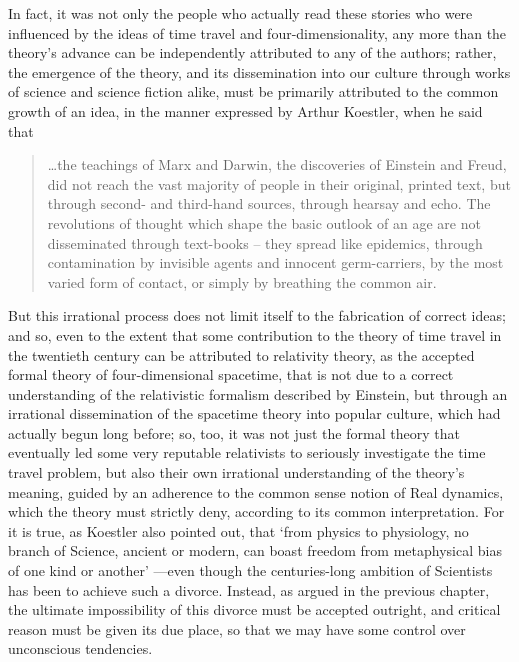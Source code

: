 In fact, it was not only the people who actually read these stories who were influenced by the ideas of time travel and four-dimensionality, any more than the theory's advance can be independently attributed to any of the authors; rather, the emergence of the theory, and its dissemination into our culture through works of science and science fiction alike, must be primarily attributed to the common growth of an idea, in the manner expressed by Arthur Koestler, when he said that \cite{Koestler1959}
\begin{quote}
\ldots the teachings of Marx and Darwin, the discoveries of Einstein and Freud, did not reach the vast majority of people in their original, printed text, but through second- and third-hand sources, through hearsay and echo. The revolutions of thought which shape the basic outlook of an age are not disseminated through text-books -- they spread like epidemics, through contamination by invisible agents and innocent germ-carriers, by the most varied form of contact, or simply by breathing the common air.
\end{quote}

But this irrational process does not limit itself to the fabrication of correct ideas; and so, even to the extent that some contribution to the theory of time travel in the twentieth century can be attributed to relativity theory, as the accepted formal theory of four-dimensional spacetime, that is not due to a correct understanding of the relativistic formalism described by Einstein, but through an irrational dissemination of the spacetime theory into popular culture, which had actually begun long before; so, too, it was not just the formal theory that eventually led some very reputable relativists to seriously investigate the time travel problem, but also their own irrational understanding of the theory's meaning, guided by an adherence to the common sense notion of Real dynamics, which the theory must strictly deny, according to its common interpretation. For it is true, as Koestler also pointed out, that `from physics to physiology, no branch of Science, ancient or modern, can boast freedom from metaphysical bias of one kind or another' \cite{Koestler1959}---even though the centuries-long ambition of Scientists has been to achieve such a divorce. Instead, as argued in the previous chapter, the ultimate impossibility of this divorce must be accepted outright, and critical reason must be given its due place, so that we may have some control over unconscious tendencies.


